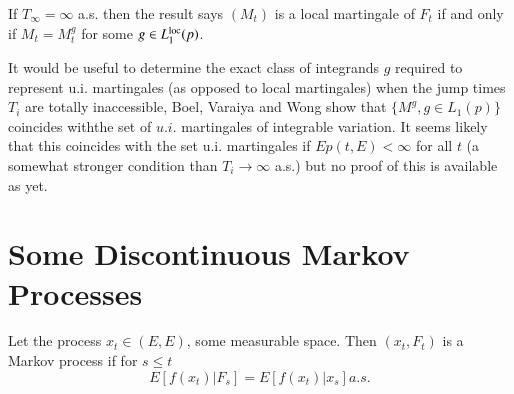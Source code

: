 \begin{coro}%
  If $T_\infty = \infty$ a.s. then the result says $(M_t)$ is
    a local martingale of  $F_t$ if and only if  $M_t = M^g_t$
  for some $g \in  L^{\operatorname{loc}}_1(p)$. 
\end{coro}

\begin{remark}%
  It would be useful to determine the exact class of integrands $g$
  required to represent u.i. martingales (as opposed to local
  martingales) when the jump times $T_i$ are totally inaccessible,
  Boel, Varaiya and Wong \cite{key4} show that $\{ M^g, g \in  L_1
  (p) \}$ coincides with\pageoriginale the set of $u.i$. martingales
  of integrable 
  variation. It seems likely that this coincides with the set
  u.i. martingales if $E p(t,E) < \infty$ for all $t$ (a somewhat
  stronger condition than $T_i \rightarrow \infty$ a.s.) but no proof
  of this is available as yet. 
\end{remark}


\section{Some Discontinuous Markov Processes}\label{chap1:sec2}%

\medskip
{}

Let the process $x_t \in  (E, E)$, some measurable space. Then
$(x_t, F_t)$ is a Markov process if for $s \le t$  
$$
E[f(x_t) |F_s] = E[f(x_t) |x_s] a.s.
$$

